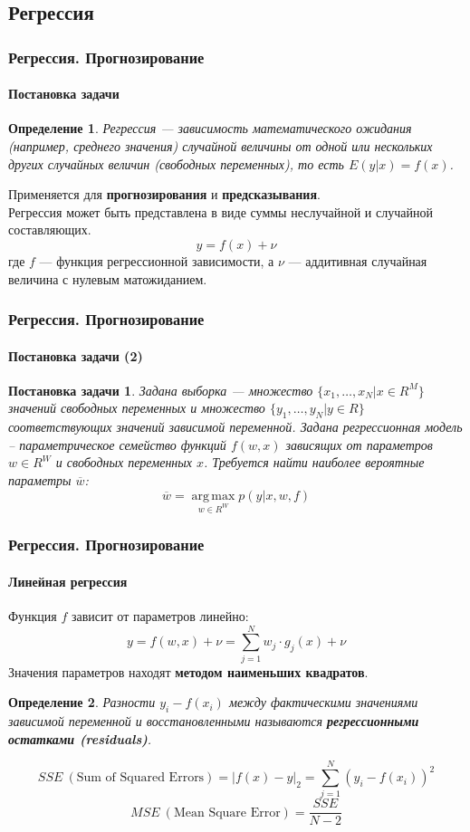 \documentclass[xcolor=table]{beamer}
\newtheorem{defn}{Определение}
\newtheorem{prob}{Постановка задачи}
\begin{document}
\subsection{Регрессия}

\begin{frame}
  \frametitle{Регрессия. Прогнозирование}
  \framesubtitle{Постановка задачи}

  \begin{defn}
    Регрессия — зависимость математического ожидания (например, среднего значения) случайной величины от одной или нескольких других случайных величин (свободных переменных), то есть $E(y|x) = f(x)$.
  \end{defn}
  Применяется для \textbf{прогнозирования} и \textbf{предсказывания}.\\
  Регрессия может быть представлена в виде суммы неслучайной и случайной составляющих.
  \[y = f(x) + \nu\]
  где $f$ — функция регрессионной зависимости, а $\nu$ — аддитивная случайная величина с нулевым матожиданием.
\end{frame}

\begin{frame}
  \frametitle{Регрессия. Прогнозирование}
  \framesubtitle{Постановка задачи (2)}

  \begin{prob}
    Задана выборка — множество $\{x_1, \dots, x_N | x \in R^M\}$ значений свободных переменных и множество $\{y_1, \dots, y_N | y \in R \}$ соответствующих 
    значений зависимой переменной. Задана регрессионная модель -- параметрическое семейство функций $f(w,x)$ зависящих
    от параметров $w \in R^W$ и свободных переменных $x$. Требуется найти наиболее вероятные параметры $\overline{w}$:
    \vspace{-10pt}
    \[
    \overline{w} = \operatorname*{arg\,max}_{w \in R^W}p(y | x, w, f)
    \]
  \end{prob}
\end{frame}

\begin{frame}
  \frametitle{Регрессия. Прогнозирование}
  \framesubtitle{Линейная регрессия}

  Функция $f$ зависит от параметров  линейно:
  \[ y = f(w, x) + \nu = \sum_{j=1}^N{w_j \cdot g_j(x)} + \nu\]
  Значения параметров находят \textbf{методом наименьших квадратов}. \\
  \begin{defn}
  Разности $y_i - f(x_i)$ между фактическими значениями зависимой переменной и восстановленными называются \textbf{регрессионными остатками (residuals)}.
  \end{defn}
  \vspace{-10pt}
  \[SSE~(\text{Sum of Squared Errors}) = |f(x) - y|_2 = \sum_{j=1}^N(y_i - f(x_i))^2\]
  \[MSE~(\text{Mean Square Error}) = \frac{SSE}{N - 2}\]
\end{frame}
\end{document}
